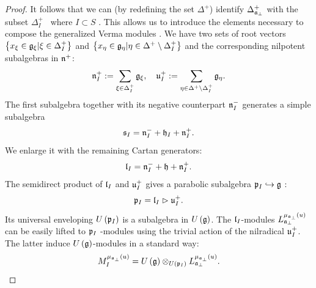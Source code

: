 \documentclass[12pt]{article}
\theoremstyle{definition}
\begin{document}
\begin{proof}
It follows that we can (by redefining the set $\Delta ^{+}$) identify $%
\Delta _{\frak{a}_{\perp }}^{+}$ with the subset $\Delta _{I}^{+}$ \ where $%
I\subset S$ . This allows us to introduce the elements necessary to compose
the generalized Verma modules
\cite{lepowsky1977generalization,humphreys2008representations}.
We have two sets of root
vectors $\left\{ x_{\xi }\in \frak{g}_{\xi }|\xi \in \Delta _{I}^{+}\right\}
$ and $\left\{ x_{\eta }\in \frak{g}_{\eta }|\eta \in \Delta ^{+}\setminus
\Delta _{I}^{+}\right\} $ and the corresponding nilpotent subalgebras in $\frak{n}%
^{+}$:
\begin{equation*}
\frak{n}_{I}^{+}:=\sum_{\xi \in \Delta _{I}^{+}}\frak{g}_{\xi },\quad
\frak{u}_{I}^{+}:=\sum_{\eta \in \Delta ^{+}\setminus \Delta _{I}^{+}}\frak{g}%
_{\eta }.
\end{equation*}
The first subalgebra together with its negative counterpart $\frak{n}%
_{I}^{-} $ generates a simple subalgebra
\begin{equation*}
\frak{s}_{I}=\frak{n}_{I}^{-}+\frak{h}_{I}+\frak{n}_{I}^{+}.
\end{equation*}
We enlarge it with the remaining Cartan generators:
\begin{equation*}
\frak{l}_{I}=\frak{n}_{I}^{-}+\frak{h}+\frak{n}_{I}^{+}.
\end{equation*}
The semidirect product of $\frak{l}_{I}$ and $\frak{u}_{I}^{+}$
gives a parabolic subalgebra $\frak{p}_{I}\hookrightarrow \frak{g}$ :
\begin{equation}
\frak{p}_{I}=\frak{l}_{I}\vartriangleright \frak{u}_{I}^{+}.
\label{paralolic subalg}
\end{equation}
Its universal enveloping $U\left( \frak{p}_{I}\right) $ is a subalgebra in $%
U\left( \frak{g}\right) $. The $\frak{l}_{I}$-modules $L_{\frak{a}_{\perp }}^{\mu _{%
\frak{a}_{\perp }}\left( u\right) }$ can be easily lifted to $\frak{p}_{I}$%
-modules using the trivial action of the nilradical $\frak{u}_{I}^{+}$. The
latter induce $U\left( \frak{g}\right) $-modules in a standard way:
\begin{equation*}
M_{I}^{\mu _{\frak{a}_{\perp }}\left( u\right) }=U\left( \frak{g}\right)
\otimes _{U\left( \frak{p}_{I}\right) }L_{\frak{a}_{\perp }}^{\mu _{\frak{a}%
_{\perp }}\left( u\right) }.
\end{equation*}


\end{proof}
\end{document}
